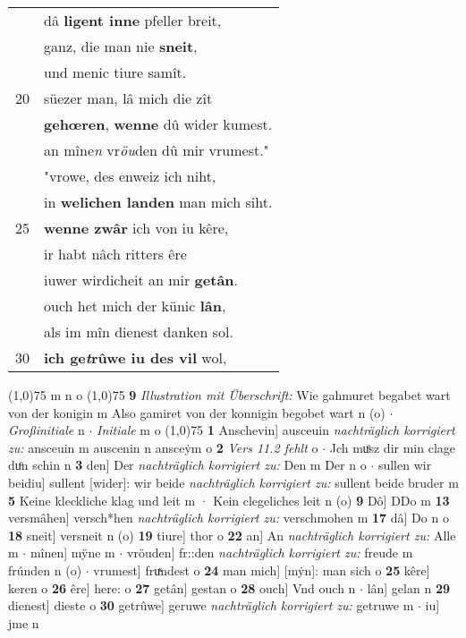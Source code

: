 \documentclass[8pt,a4paper,notitlepage]{article}
\begin{document}
\begin{table}[ht]
\begin{minipage}[t]{0.5\linewidth}
\begin{tabular}{rl}
 & dâ \textbf{ligent inne} pfeller breit,\\ 
 & ganz, die man nie \textbf{sneit},\\ 
 & und menic tiure samît.\\ 
20 & süezer man, lâ mich die zît\\ 
 & \textbf{gehœren}, \textbf{wenne} dû wider kumest.\\ 
 & an mîne\textit{n} vr\textit{öu}den dû mir vrumest."\\ 
 & "vrowe, des enweiz ich niht,\\ 
 & in \textbf{welichen landen} man mich siht.\\ 
25 & \textbf{wenne zwâr} ich von iu kêre,\\ 
 & ir habt nâch ritters êre\\ 
 & iuwer wirdicheit an mir \textbf{getân}.\\ 
 & ouch het mich der künic \textbf{lân},\\ 
 & als im mîn dienest danken sol.\\ 
30 & \textbf{ich ge\textit{t}rûwe iu des vil} wol,\\ 
\end{tabular}
\scriptsize
\line(1,0){75} \newline
m n o \newline
\line(1,0){75} \newline
\textbf{9} \textit{Illustration mit Überschrift:} Wie gahmuret begabet wart von der konigin m  Also gamiret von der konnigin begobet wart n (o)   $\cdot$ \textit{Großinitiale} n   $\cdot$ \textit{Initiale} m o  \newline
\line(1,0){75} \newline
\textbf{1} Anschevin] ausceuin \textit{nachträglich korrigiert zu:} ansceuin m auscenin n ansceẏm o \textbf{2} \textit{Vers 11.2 fehlt} o   $\cdot$ Jch muͦsz dir min clage duͦn schin n \textbf{3} den] Der \textit{nachträglich korrigiert zu:} Den m Der n o  $\cdot$ sullen wir beidiu] sullent [wider]: wir beide \textit{nachträglich korrigiert zu:} sullent beide bruder m \textbf{5} Keine kleckliche klag und leit m · Kein clegeliches leit n (o) \textbf{9} Dô] DDo m \textbf{13} versmâhen] versch*hen \textit{nachträglich korrigiert zu:} verschmohen m \textbf{17} dâ] Do n o \textbf{18} sneit] versneit n (o) \textbf{19} tiure] thor o \textbf{22} an] An \textit{nachträglich korrigiert zu:} Alle m  $\cdot$ mînen] mÿne m  $\cdot$ vröuden] fr::den \textit{nachträglich korrigiert zu:} freude m frúnden n (o)  $\cdot$ vrumest] fruͯndest o \textbf{24} man mich] [mẏn]: man sich o \textbf{25} kêre] keren o \textbf{26} êre] here: o \textbf{27} getân] gestan o \textbf{28} ouch] Vnd ouch n  $\cdot$ lân] gelan n \textbf{29} dienest] dieste o \textbf{30} getrûwe] geruwe \textit{nachträglich korrigiert zu:} getruwe m  $\cdot$ iu] jme n \newline
\end{minipage}
\end{table}
\end{document}
